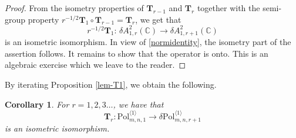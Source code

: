 \documentclass{birkart}
\newtheorem{cor}[thm]{Corollary}
\theoremstyle{definition}
\theoremstyle{remark}
\numberwithin{equation}{section}
\numberwithin{figure}{section}
\newcommand{\e}{\mathrm e}
\newcommand{\1}{{\mathbf 1}}
\newcommand{\C}{{\mathbb C}}
\newcommand{\Tope}{{\mathbf T}}
\newcommand{\Fspace}{{\delta\mathrm{Pol}}}
\begin{document}
\begin{proof}
From the isometry properties of $\Tope_{r-1}$ and $\Tope_{r}$ together 
with the semi-group property 
$r^{-1/2}\Tope_{1}\circ\Tope_{r-1}=\Tope_{r}$, we get that 
\[
r^{-1/2}\Tope_{1}:\,\delta A^2_{1,r}(\C)\to\delta A^2_{1,r+1}(\C)
\]
is an isometric isomorphism. In view of \eqref{normidentity}, the isometry
part of the assertion follows. It remains to show that the operator is onto.
This is an algebraic exercise which we leave to the reader. 
%
\end{proof}

By iterating Proposition \ref{lem-T1}, we obtain the following.

\begin{cor} 
\label{tildecor}
For $r=1,2,3\ldots$, we have that
\[ 
\Tope_r:\mathrm{Pol}^{\langle1\rangle}_{m,n,1}\to
\Fspace^{\langle1\rangle}_{m,n,r+1} 
\]
is an isometric isomorphism.
\end{cor}

\medskip
\end{document}
